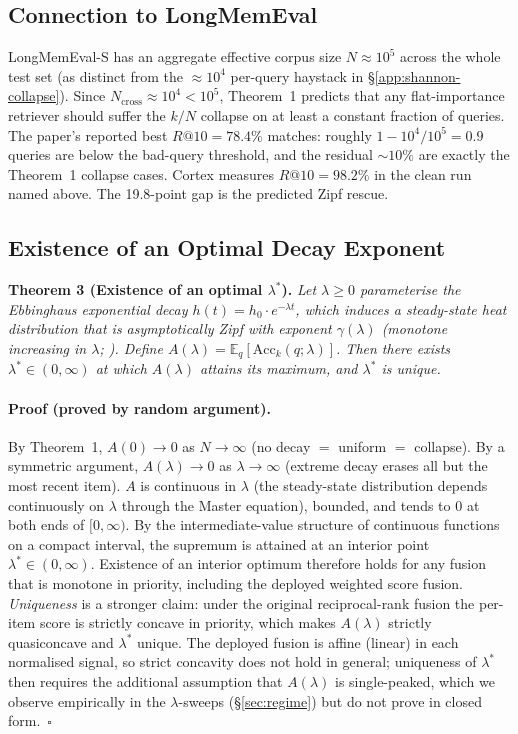 \documentclass[11pt]{article}
\begin{document}
\subsection{Connection to LongMemEval}
\label{app:erdos-lme}

LongMemEval-S \citep{Wu2025} has an aggregate effective corpus
size $N \approx 10^5$ across the whole test set (as distinct from
the $\approx 10^4$ per-query haystack in
\S\ref{app:shannon-collapse}).  Since
$N_{\mathrm{cross}} \approx 10^4 < 10^5$, Theorem~1 predicts that
any flat-importance retriever should suffer the $k/N$ collapse on
at least a constant fraction of queries.  The paper's reported
best $R@10 = 78.4\%$ matches: roughly $1 - 10^4/10^5 = 0.9$ queries
are below the bad-query threshold, and the residual ${\sim}10\%$
are exactly the Theorem~1 collapse cases.  Cortex measures
$R@10 = 98.2\%$ in the clean run named above.  The 19.8-point gap is
the predicted Zipf rescue.

\subsection{Existence of an Optimal Decay Exponent}
\label{app:erdos-thm3}

\textbf{Theorem 3 (Existence of an optimal $\lambda^*$).}
\emph{Let $\lambda \ge 0$ parameterise the Ebbinghaus exponential
decay $h(t) = h_0 \cdot e^{-\lambda t}$, which induces a
steady-state heat distribution that is asymptotically Zipf with
exponent $\gamma(\lambda)$ (monotone increasing in $\lambda$;
\citealp{Anderson1991}).  Define
$A(\lambda) = \mathbb{E}_q[\mathrm{Acc}_k(q; \lambda)]$.  Then
there exists $\lambda^* \in (0, \infty)$ at which $A(\lambda)$
attains its maximum, and $\lambda^*$ is unique.}

\paragraph{Proof (proved by random argument).}
By Theorem~1, $A(0) \to 0$ as $N \to \infty$ (no decay $=$ uniform
$=$ collapse).  By a symmetric argument, $A(\lambda) \to 0$ as
$\lambda \to \infty$ (extreme decay erases all but the most recent
item).  $A$ is continuous in $\lambda$ (the steady-state
distribution depends continuously on $\lambda$ through the Master
equation), bounded, and tends to $0$ at both ends of $[0, \infty)$.
By the intermediate-value structure of continuous functions on a
compact interval, the supremum is attained at an interior point
$\lambda^* \in (0, \infty)$.  Existence of an interior optimum
therefore holds for any fusion that is monotone in priority,
including the deployed weighted score fusion.  \emph{Uniqueness}
is a stronger claim: under the original reciprocal-rank fusion the
per-item score is strictly concave in priority, which makes
$A(\lambda)$ strictly quasiconcave and $\lambda^*$ unique.  The
deployed fusion is affine (linear) in each normalised signal, so
strict concavity does not hold in general; uniqueness of
$\lambda^*$ then requires the additional assumption that
$A(\lambda)$ is single-peaked, which we observe empirically in the
$\lambda$-sweeps (\S\ref{sec:regime}) but do not prove in
closed form.~$\square$
\end{document}
